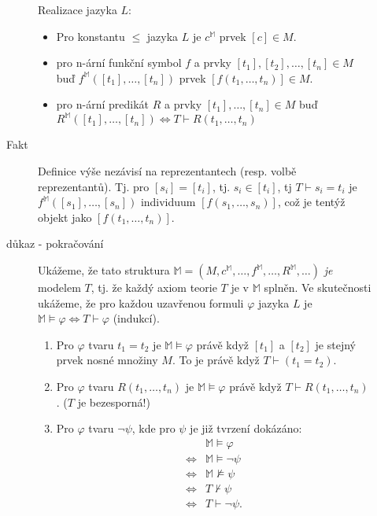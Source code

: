 \documentclass[a4paper]{article}
\begin{document}
\begin{description}
\begin{description}
					Realizace jazyka $L$:
					\begin{itemize}
						\item Pro konstantu $\le$ jazyka $L$ je $c^{\mathbb{M}}$ prvek
							$[c] \in M$.
						\item pro n-ární funkční symbol $f$ a prvky
							$[t_1], [t_2], \ldots, [t_n] \in M$ buď
							$f^{\mathbb{M}}\left( [t_1], \ldots, [t_n] \right)$
							prvek $[f(t_1, \ldots, t_n)] \in M$.
						\item pro n-ární predikát $R$ a prvky $[t_1], \ldots, [t_n] \in M$ 
							buď $R^{\mathbb{M}}([t_1], \ldots, [t_n]) \iff
							T \vdash R(t_1, \ldots, t_n)$
					\end{itemize}
				\item[Fakt] Definice výše nezávisí na reprezentantech (resp. volbě reprezentantů).
					Tj. pro $[s_i] = [t_i]$, tj. $s_i \in [t_i]$, tj $T \vdash s_i = t_i$ 
					je $f^{\mathbb{M}}([s_1], \ldots, [s_n])$ individuum $[f(s_1, \ldots, s_n)]$,
					což je tentýž objekt jako $[f(t_1, \ldots, t_n)]$.
				\item[důkaz - pokračování] Ukážeme, že tato struktura
					$\mathbb{M} =
					(M, c^{\mathbb{M}}, \ldots, f^{\mathbb{M}}, \ldots, R^{\mathbb{M}}, \ldots)$
					\textit{je} modelem $T$, tj. že každý axiom teorie $T$ je v $\mathbb{M}$ 
					splněn. Ve skutečnosti ukážeme, že pro každou uzavřenou formuli
					$\varphi$ jazyka $L$ je $\mathbb{M} \models \varphi \iff T \vdash \varphi$
					(indukcí).
					\begin{enumerate}
						\item Pro $\varphi$ tvaru $t_1 = t_2$ je $\mathbb{M} \models \varphi$
							právě když $[t_1]$ a $[t_2]$ je stejný prvek nosné
							množiny $M$. To je právě když $T \vdash (t_1 = t_2)$.
						\item Pro $\varphi$ tvaru $R(t_1, \ldots, t_n)$ je
							$\mathbb{M} \models \varphi$ právě když $T \vdash R(t_1, \ldots, t_n)$.
							($T$ je bezesporná!)
						\item Pro $\varphi$ tvaru $\neg \psi$, kde pro $\psi$ je
							již tvrzení dokázáno:
							\begin{align*}
								&\mathbb{M} \models \varphi \\
								\iff& \mathbb{M} \models \neg \psi \\
								\iff& \mathbb{M} \not \models \psi \\
								\iff& T \not \vdash \psi \\
								\iff& T \vdash \neg \psi
							.\end{align*}

\end{enumerate}
\end{description}
\end{description}
\end{document}
